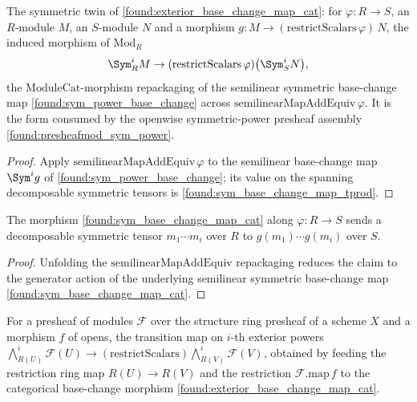 \begin{lemma}
  \label{found:sym_base_change_map_cat}
  The symmetric twin of \cref{found:exterior_base_change_map_cat}: for
  \(\varphi:R\to S\), an \(R\)-module \(M\), an \(S\)-module \(N\) and a morphism
  \(g:M\to(\mathrm{restrictScalars}\,\varphi)\,N\), the induced morphism of
  \(\mathrm{Mod}_R\)
  \[
    \Sym^i_R M\to(\mathrm{restrictScalars}\,\varphi)\bigl(\Sym^i_S N\bigr),
  \]
  the \(\mathrm{ModuleCat}\)-morphism repackaging of the semilinear symmetric
  base-change map \cref{found:sym_power_base_change} across
  \(\mathrm{semilinearMapAddEquiv}\,\varphi\).  It is the form consumed by the
  openwise symmetric-power presheaf assembly \cref{found:presheafmod_sym_power}.
\end{lemma}

\begin{proof}
  \leanok
  Apply \(\mathrm{semilinearMapAddEquiv}\,\varphi\) to the semilinear base-change map
  \(\Sym^i g\) of \cref{found:sym_power_base_change}; its value on the spanning
  decomposable symmetric tensors is \cref{found:sym_base_change_map_tprod}.
\end{proof}

\begin{lemma}
  \label{found:sym_base_change_map_cat_tprod}
  The morphism \cref{found:sym_base_change_map_cat} along \(\varphi:R\to S\) sends a
  decomposable symmetric tensor \(m_1\cdots m_i\) over \(R\) to
  \(g(m_1)\cdots g(m_i)\) over \(S\).
\end{lemma}

\begin{proof}
  \leanok
  Unfolding the \(\mathrm{semilinearMapAddEquiv}\) repackaging reduces the claim to
  the generator action of the underlying semilinear symmetric base-change map
  \cref{found:sym_base_change_map_cat}.
\end{proof}

\begin{lemma}
  \label{found:presheafmod_extpowmap}
  For a presheaf of modules \(\mathcal F\) over the structure ring presheaf of a
  scheme \(X\) and a morphism \(f\) of opens, the transition map on \(i\)-th exterior
  powers
  \(\bigwedge^i_{R(U)}\mathcal F(U)\to(\mathrm{restrictScalars})\bigwedge^i_{R(V)}\mathcal F(V)\),
  obtained by feeding the restriction ring map \(R(U)\to R(V)\) and the restriction
  \(\mathcal F.\mathrm{map}\,f\) to the categorical base-change morphism
  \cref{found:exterior_base_change_map_cat}.
\end{lemma}


